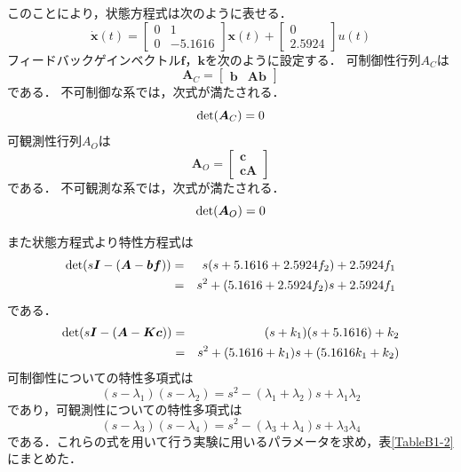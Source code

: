 \documentclass[12pt]{jsarticle}
\begin{document}
このことにより，状態方程式は次のように表せる．
\begin{equation}
  \label{dotx-Ax+bu}
  \dot{\bm x}(t) = \left[\begin{array}{cc}0&1\\0&-5.1616\end{array}\right]{\bm x}(t) + \left[\begin{array}{c}0\\2.5924\end{array}\right]u(t)
\end{equation}
フィードバックゲインベクトル$\bm f$，$\bm k$を次のように設定する．
可制御性行列$A_C$は
\begin{equation}
  \label{}
  \bm A_C = \left[\begin{array}{cc}{\bm b} & {\bm A}{\bm b}\end{array}\right]
\end{equation}
である．
不可制御な系では，次式が満たされる．
\begin{equation}
  {\rm det} ({\bm A_C}) = 0
\end{equation}
可観測性行列$A_O$は
\begin{equation}
  \label{}
  \bm A_O = \left[\begin{array}{c}{\bm c}\\{\bm c}{\bm A}\end{array}\right]
\end{equation}である．
不可観測な系では，次式が満たされる．
\begin{equation}
  {\rm det} ({\bm A_O}) = 0
\end{equation}

また状態方程式より特性方程式は
\begin{eqnarray}
  \label{regulator-poll-equation}
  {\rm det}(s{\bm I} - ({\bm A}-{\bm b}{\bm f}))&=&s(s+5.1616+2.5924f_2)+2.5924f_1 \nonumber \\
  &=& s^2 + (5.1616+2.5924f_2)s + 2.5924f_1
\end{eqnarray}
である．
\begin{eqnarray}
  \label{observer-poll-equation}
  {\rm det}(s{\bm I} - ({\bm A}-{\bm K}{\bm c}))&=& (s+k_1)(s+5.1616)+k_2\nonumber \\
  &=& s^2 + (5.1616+k_1)s + (5.1616k_1 + k_2)
\end{eqnarray}
可制御性についての特性多項式は
\begin{equation}
  \label{lambda=-10regletor}
  (s - \lambda_1)(s - \lambda_2)=s^2-(\lambda_1+\lambda_2)s+\lambda_1 \lambda_2
\end{equation}
であり，可観測性についての特性多項式は
\begin{equation}
  \label{lambda=-10observer}
  (s - \lambda_3)(s - \lambda_4)=s^2-(\lambda_3+\lambda_4)s+\lambda_3 \lambda_4
\end{equation}
である．これらの式を用いて行う実験に用いるパラメータを求め，表\ref{TableB1-2}にまとめた．
\end{document}
